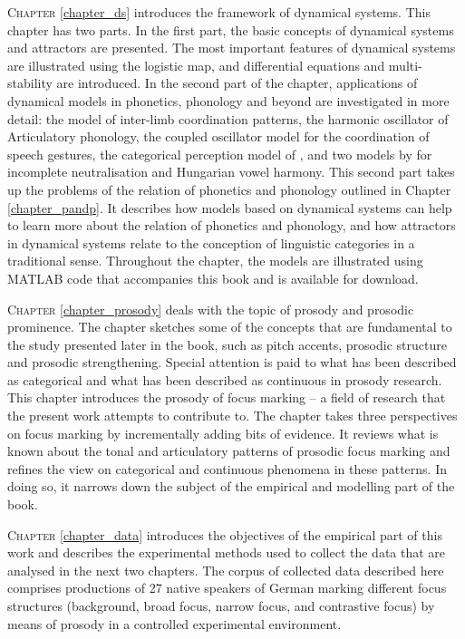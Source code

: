 \textsc{Chapter} \ref{chapter_ds} introduces the framework of dynamical systems. This chapter has two parts. In the first part, the basic concepts of dynamical systems and attractors are presented. The most important features of dynamical systems are illustrated using the logistic map, and differential equations and multi-stability are introduced. In the second part of the chapter, applications of dynamical models in phonetics, phonology and beyond are investigated in more detail: the \citet{HakenKelsoBunz1985} model of inter-limb coordination patterns, the harmonic oscillator of Articulatory phonology, the coupled oscillator model for the coordination of speech gestures, the categorical perception model of \cite{Tulleretal1994}, and two models by \citet{GafosBenus2006} for incomplete neutralisation and Hungarian vowel harmony. This second part takes up the problems of the relation of phonetics and phonology outlined in Chapter \ref{chapter_pandp}. It describes how models based on dynamical systems can help to learn more about the relation of phonetics and phonology, and how attractors in dynamical systems relate to the conception of linguistic categories in a traditional sense. Throughout the chapter, the models are illustrated using MATLAB code that accompanies this book and is available for download.

\textsc{Chapter} \ref{chapter_prosody} deals with the topic of prosody and prosodic prominence. The chapter sketches some of the concepts that are fundamental to the study presented later in the book, such as pitch accents, prosodic structure and prosodic strengthening. Special attention is paid to what has been described as categorical and what has been described as continuous in prosody research. This chapter introduces the prosody of focus marking -- a field of research that the present work attempts to contribute to. The chapter takes three perspectives on focus marking by incrementally adding bits of evidence. It reviews what is known about the tonal and articulatory patterns of prosodic focus marking and refines the view on categorical and continuous phenomena in these patterns. In doing so, it narrows down the subject of the empirical and modelling part of the book. 

\textsc{Chapter} \ref{chapter_data} introduces the objectives of the empirical part of this work and describes the experimental methods used to collect the data that are analysed in the next two chapters. The corpus of collected data described here comprises productions of 27 native speakers of German marking different focus structures (background, broad focus, narrow focus, and contrastive focus) by means of prosody in a controlled experimental environment.

